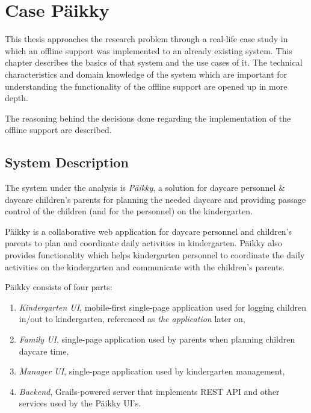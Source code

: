 
\chapter{Case Päikky}

This thesis approaches the research problem through a real-life case study in which an offline support was implemented to an already existing system. This chapter describes the basics of that system and the use cases of it. The technical characteristics and domain knowledge of the system which are important for understanding the functionality of the offline support are opened up in more depth. 

The reasoning behind the decisions done regarding the implementation of the offline support are described.


\section{System Description}

The system under the analysis is \textit{Päikky}, a solution for daycare personnel & daycare children’s parents for planning the needed daycare and providing passage control of the children (and for the personnel) on the kindergarten. 

Päikky is a collaborative web application for daycare personnel and children's parents to plan and coordinate daily activities in kindergarten. Päikky also provides functionality which helps kindergarten personnel to coordinate the daily activities on the kindergarten and communicate with the children's parents.

Päikky consists of four parts:

\begin{enumerate}
	\item \textit{Kindergarten UI}, mobile-first single-page application used for logging children in/out to kindergarten, referenced as \textit{the application} later on,
	\item \textit{Family UI}, single-page application used by parents when planning children daycare time,
	\item \textit{Manager UI}, single-page application used by kindergarten management,
	\item \textit{Backend}, Grails-powered server that implements REST API and other services used by the Päikky UI's.
\end{enumerate}

